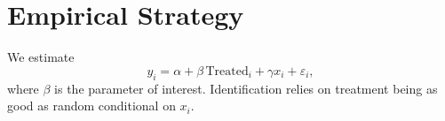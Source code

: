 \section{Empirical Strategy}\label{sec:strategy}

We estimate
\begin{equation}
  y_i = \alpha + \beta\, \text{Treated}_i + \gamma x_i + \varepsilon_i ,
\end{equation}
where $\beta$ is the parameter of interest. Identification relies on treatment
being as good as random conditional on $x_i$.
